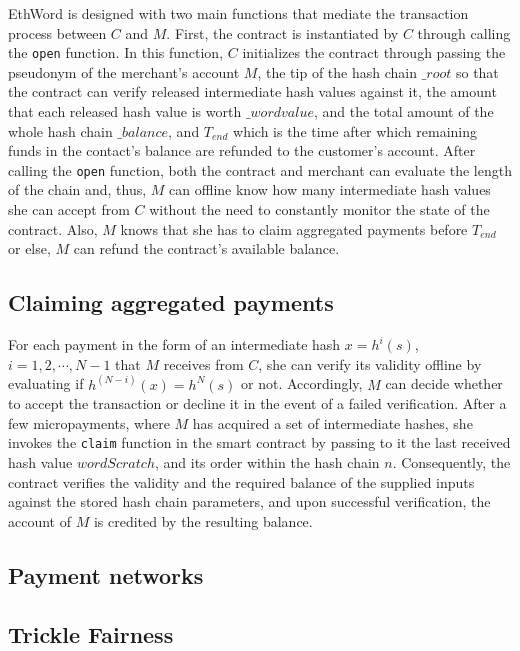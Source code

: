 EthWord is designed with two main functions that mediate the transaction process between $C$ and $M$. First, the contract is instantiated by $C$ through calling the \texttt{open} function. In this function, $C$ initializes the contract through passing the pseudonym of the merchant's account $M$, the tip of the hash chain $\_root$ so that the contract can verify released intermediate hash values against it, the amount that each released hash value is worth $\_wordvalue$, and the total amount of the whole hash chain $\_balance$, and $T_{end}$ which is the time after which remaining funds in the contact's balance are refunded to the customer's account. After calling the \texttt{open} function, both the contract and merchant can evaluate the length of the chain and, thus, $M$ can offline know how many intermediate hash values she can accept from $C$ without the need to constantly monitor the state of the contract. Also, $M$ knows that she has to claim aggregated payments before $T_{end}$ or else, $M$ can refund the contract's available balance.

\subsection{Claiming aggregated payments} 

For each payment in the form of an intermediate hash $x=h^i(s)$, $i=1,2,\cdots,N-1$ that $M$ receives from $C$, she can verify its validity offline by evaluating if $h^{(N-i)}(x) = h^N(s)$ or not. Accordingly, $M$ can decide whether to accept the transaction or decline it in the event of a failed verification. After a few micropayments, where $M$ has acquired a set of intermediate hashes, she invokes the \texttt{claim} function in the smart contract by passing to it the last received hash value $wordScratch$, and its order within the hash chain $n$. Consequently, the contract verifies the validity and the required balance of the supplied inputs against the stored hash chain parameters, and upon successful verification, the account of $M$ is credited by the resulting balance.

\subsection{Payment networks} 

\subsection{Trickle Fairness} 


